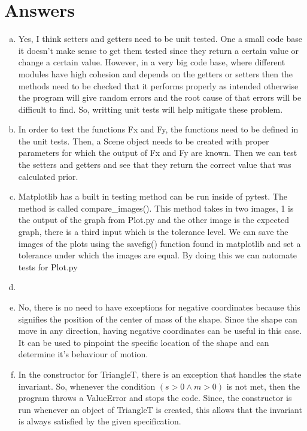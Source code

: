 \documentclass[12pt]{article}
\begin{document}
\section{Answers}

\begin{enumerate}[a)]

	\item Yes, I think setters and getters need to be unit tested. One a small code base it doesn't make sense to get them tested since they return a certain value or change a certain value. However, in a very big code base, where different modules have high cohesion and depends on the getters or setters then the methods need to be checked that it performs properly as intended otherwise the program will give random errors and the root cause of that errors will be difficult to find. So, writting unit tests will help mitigate these problem.

	\item In order to test the functions Fx and Fy, the functions need to be defined in the unit tests. Then, a Scene object needs to be created with proper parameters for which the output of Fx and Fy are known. Then we can test the setters and getters and see that they return the correct value that was calculated prior.

	\item Matplotlib has a built in testing method can be run inside of pytest. The method is called compare\_images(). This method takes in two images, 1 is the output of the graph from Plot.py and the other image is the expected graph, there is a third input which is the tolerance level. We can save the images of the plots using the savefig() function found in matplotlib and set a tolerance under which the images are equal. By doing this we can automate tests for Plot.py

	\item

	\item No, there is no need to have exceptions for negative coordinates because this signifies the position of the center of mass of the shape. Since the shape can move in any direction, having negative coordinates can be useful in this case. It can be used to pinpoint the specific location of the shape and can determine it's behaviour of motion.

	\item In the constructor for TriangleT, there is an exception that handles the state invariant. So, whenever the condition $(s > 0 \land m > 0)$ is not met, then the program throws a ValueError and stops the code. Since, the constructor is run whenever an object of TriangleT is created, this allows that the invariant is always satisfied by the given specification.


\end{enumerate}
\end{document}
